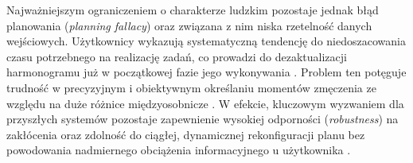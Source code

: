 \indent Najważniejszym ograniczeniem o charakterze ludzkim pozostaje jednak błąd planowania (\textit{planning fallacy}) oraz związana z nim niska rzetelność danych wejściowych. Użytkownicy wykazują systematyczną tendencję do niedoszacowania czasu potrzebnego na realizację zadań, co prowadzi do dezaktualizacji harmonogramu już w początkowej fazie jego wykonywania \cite{gap2024}. Problem ten potęguje trudność w precyzyjnym i obiektywnym określaniu momentów zmęczenia ze względu na duże różnice międzyosobnicze \cite{fatigue2025}. W efekcie, kluczowym wyzwaniem dla przyszłych systemów pozostaje zapewnienie wysokiej odporności (\textit{robustness}) na zakłócenia oraz zdolność do ciągłej, dynamicznej rekonfiguracji planu bez powodowania nadmiernego obciążenia informacyjnego u użytkownika \cite{future2025, orchestration2026}.

